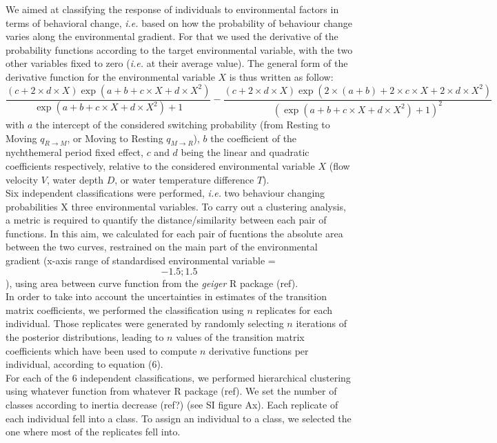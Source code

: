 \documentclass[
  letterpaper,
  DIV=11,
  numbers=noendperiod]{scrartcl}
\begin{document}
We aimed at classifying the response of individuals to environmental
factors in terms of behavioral change, \emph{i.e.} based on how the
probability of behaviour change varies along the environmental gradient.
For that we used the derivative of the probability functions according
to the target environmental variable, with the two other variables fixed
to zero (\emph{i.e.} at their average value). The general form of the
derivative function for the environmental variable \(X\) is thus written
as follow:
\[\frac{(c + 2\times d\times X)\exp(a + b + c\times X + d\times X^2)}{\exp(a + b + c\times X + d\times X^2) + 1} -
\frac{(c + 2\times d\times X)\exp(2\times (a + b) + 2\times c\times X + 2\times d\times X^2)}{(\exp(a + b + c\times X + d\times X^2) + 1)^2}\]
with \(a\) the intercept of the considered switching probability (from
Resting to Moving \(q_{R \rightarrow M}\), or Moving to Resting
\(q_{M \rightarrow R}\)), \(b\) the coefficient of the nychthemeral
period fixed effect, \(c\) and \(d\) being the linear and quadratic
coefficients respectively, relative to the considered environmental
variable \(X\) (flow velocity \(V\), water depth \(D\), or water
temperature difference \(T\)).\\
Six independent classifications were performed, \emph{i.e.} two
behaviour changing probabilities X three environmental variables. To
carry out a clustering analysis, a metric is required to quantify the
distance/similarity between each pair of functions. In this aim, we
calculated for each pair of fucntions the absolute area between the two
curves, restrained on the main part of the environmental gradient
(x-axis range of standardised environmental variable = \[-1.5; 1.5\]),
using area between curve function from the \emph{geiger} R package
(ref).\\
In order to take into account the uncertainties in estimates of the
transition matrix coefficients, we performed the classification using
\(n\) replicates for each individual. Those replicates were generated by
randomly selecting \(n\) iterations of the posterior distributions,
leading to \(n\) values of the transition matrix coefficients which have
been used to compute \(n\) derivative functions per individual,
according to equation (6).\\
For each of the 6 independent classifications, we performed hierarchical
clustering using whatever function from whatever R package (ref). We set
the number of classes according to inertia decrease (ref?) (see SI
figure Ax). Each replicate of each individual fell into a class. To
assign an individual to a class, we selected the one where most of the
replicates fell into.
\end{document}
